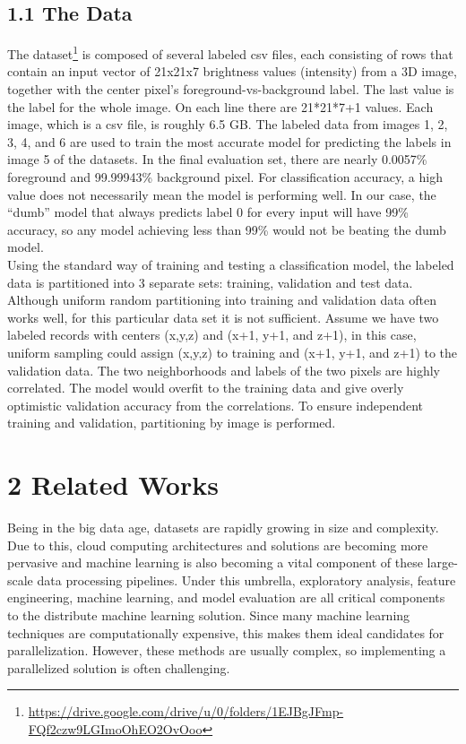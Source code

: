 \documentclass{neu_handout}
\begin{document}
\subsection*{1.1 The Data}
The dataset\footnote{\url{https://drive.google.com/drive/u/0/folders/1EJBgJFmp-FQf2czw9LGImoOhEO2OvOoo}} is composed of several labeled csv files, each consisting of rows that contain an input vector of 21x21x7
brightness values (intensity) from a 3D image, together with the center pixel's foreground-vs-background label. The last value is the label for the whole image. On each line there are 21*21*7+1 values. Each image, which is a csv file, is roughly 6.5 GB. The labeled data from images 1, 2, 3, 4, and 6 are used to train the most accurate model for predicting the labels in image 5 of the datasets. In the final evaluation set, there are nearly 0.0057\% foreground and 99.99943\% background pixel. For classification accuracy, a high value does not necessarily mean the model is performing well. In our case, the ``dumb'' model that always predicts label 0 for every input will have 99\% accuracy, so any model achieving less than 99\% would not be beating the dumb model. \\

Using the standard way of training and testing a classification model, the labeled data is partitioned into 3 separate sets: training, validation and test data. Although uniform random partitioning into training and validation data often works well, for this particular data set it is not sufficient. Assume we have two labeled records with centers (x,y,z) and (x+1, y+1, and z+1), in this case, uniform sampling could assign (x,y,z) to training and (x+1, y+1, and z+1) to the validation data. The two neighborhoods and labels of the two pixels are highly correlated. The model would overfit to the training data and give overly optimistic validation accuracy from the correlations. To ensure independent training and validation, partitioning by image is performed.\\

\section*{2 Related Works}
Being in the big data age, datasets are rapidly growing in size and complexity. Due to this, cloud computing architectures and solutions are becoming more pervasive and machine learning is also becoming a vital component of these large-scale data processing pipelines. Under this umbrella, exploratory analysis, feature engineering, machine learning, and model evaluation are all critical components to the distribute machine learning solution. Since many machine learning techniques are computationally expensive, this makes them ideal candidates for parallelization. However, these methods are usually complex, so implementing a parallelized solution is often challenging.\\
\end{document}
